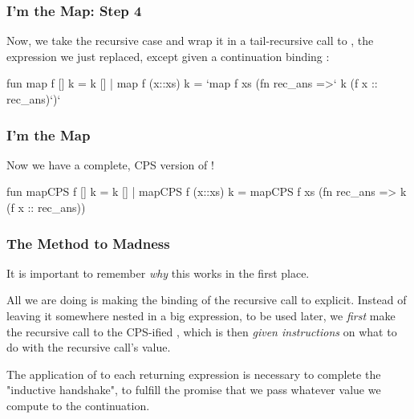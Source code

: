 \documentclass[aspectratio=169]{beamer}
\begin{document}
\begin{frame}[fragile]
  \frametitle{I'm the Map: Step 4}

  Now, we take the recursive case and wrap it in a tail-recursive call to
  , the expression we just replaced, except given a continuation binding
  :

  \begin{codeblock}
    fun map f [] k      = k []
      | map f (x::xs) k =
          `map f xs (fn rec_ans =>` k (f x :: rec_ans)`)`
  \end{codeblock}
\end{frame}

\begin{frame}[fragile]
  \frametitle{I'm the Map}

  Now we have a complete, CPS version of !

  \begin{codeblock}
    fun mapCPS f [] k      = k []
      | mapCPS f (x::xs) k =
          mapCPS f xs (fn rec_ans => k (f x :: rec_ans))
  \end{codeblock}
\end{frame}

\begin{frame}[fragile]
  \frametitle{The Method to Madness}

  It is important to remember \textit{why} this works in the first place.

  \pause
  \vspace{\fill}

  All we are doing is making the binding of the recursive call to
   explicit. Instead of leaving it somewhere nested in a big
  expression, to be used later, we \textit{first} make the recursive call to
  the CPS-ified , which is then \textit{given instructions}
  on what to do with the recursive call's value.

  \pause
  \vspace{\fill}

  The application of  to each returning expression is necessary to
  complete the "inductive handshake", to fulfill the promise that we
  pass whatever value we compute to the continuation.
\end{frame}

\end{document}

